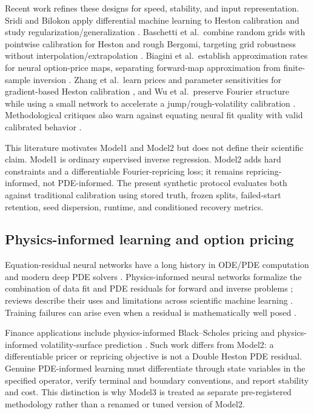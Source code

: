 Recent work refines these designs for speed, stability, and input representation. Sridi
and Bilokon apply differential machine learning to Heston calibration and study
regularization/generalization \citep{sridi2023applying}. Baschetti et al.\ combine
random grids with pointwise calibration for Heston and rough Bergomi, targeting grid
robustness without interpolation/extrapolation \citep{baschetti2024deep}. Biagini et
al.\ establish approximation rates for neural option-price maps, separating forward-map
approximation from finite-sample inversion \citep{biagini2024approximation}. Zhang et
al.\ learn prices and parameter sensitivities for gradient-based Heston calibration
\citep{zhang2025calibrating}, and Wu et al.\ preserve Fourier structure while using a
small network to accelerate a jump/rough-volatility calibration
\citep{wu2025efficient}. Methodological critiques also warn against equating neural fit
quality with valid calibrated behavior \citep{itkin2019deep}.

This literature motivates Model1 and Model2 but does not define their scientific claim.
Model1 is ordinary supervised inverse regression. Model2 adds hard constraints and a
differentiable Fourier-repricing loss; it remains repricing-informed, not PDE-informed.
The present synthetic protocol evaluates both against traditional calibration using
stored truth, frozen splits, failed-start retention, seed dispersion, runtime, and
conditioned recovery metrics.

\subsection{Physics-informed learning and option pricing}
\label{subsec:literature-pinn}

Equation-residual neural networks have a long history in ODE/PDE computation
\citep{lagaris1998artificial} and modern deep PDE solvers
\citep{sirignano2018dgm}. Physics-informed neural networks formalize the combination of
data fit and PDE residuals for forward and inverse problems
\citep{raissi2019physics}; reviews describe their uses and limitations across scientific
machine learning \citep{karniadakis2021physics,cuomo2022scientific}. Training failures
can arise even when a residual is mathematically well posed \citep{wang2022when}.

Finance applications include physics-informed Black--Scholes pricing
\citep{dhiman2023physics} and physics-informed volatility-surface prediction
\citep{kim2022physics}. Such work differs from Model2: a differentiable pricer or
repricing objective is not a Double Heston PDE residual. Genuine PDE-informed learning
must differentiate through state variables in the specified operator, verify terminal
and boundary conventions, and report stability and cost. This distinction is why Model3
is treated as separate pre-registered methodology rather than a renamed or tuned version
of Model2.

